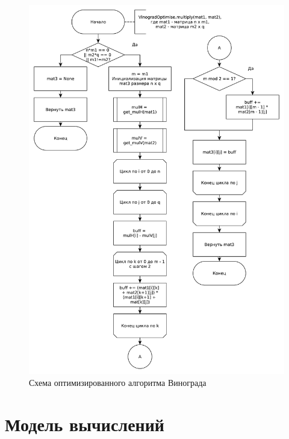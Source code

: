 \documentclass[12pt]{report}
\begin{document}
    \begin{figure}[H]
        \centering
        \includegraphics[width=0.85\linewidth]{img/VinogradOptimise}
        \caption{
                Схема оптимизированного алгоритма Винограда
            }
        \label{fig:opt_vinograd}
    \end{figure}


    \section{Модель вычислений}
\end{document}
